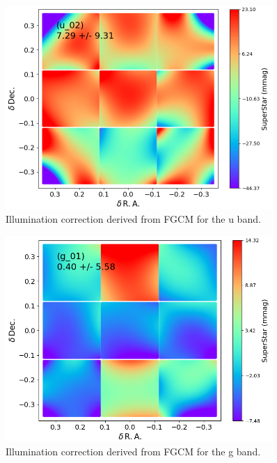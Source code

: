 \begin{figure}
  \begin{center}
    \includegraphics[width=0.9\textwidth]{photometric_calibration_figures/illumcorr_u.png}
  \end{center}
  \caption{Illumination correction derived from FGCM for the u band.}
\end{figure}

\begin{figure}
  \begin{center}
    \includegraphics[width=0.9\textwidth]{photometric_calibration_figures/illumcorr_g.png}
  \end{center}
  \caption{Illumination correction derived from FGCM for the g band.}
\end{figure}

